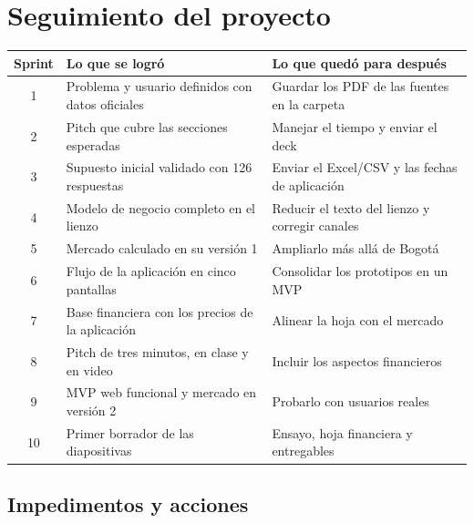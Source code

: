 \documentclass[11pt,a4paper]{article}
\begin{document}
\section{Seguimiento del proyecto}

\begin{tabularx}{\textwidth}{c X X}
  \toprule
  \textbf{Sprint} & \textbf{Lo que se logró} & \textbf{Lo que quedó para después} \\
  \midrule
  1 & Problema y usuario definidos con datos oficiales & Guardar los PDF de las fuentes en la carpeta \\
  2 & Pitch que cubre las secciones esperadas & Manejar el tiempo y enviar el deck \\
  3 & Supuesto inicial validado con 126 respuestas & Enviar el Excel/CSV y las fechas de aplicación \\
  4 & Modelo de negocio completo en el lienzo & Reducir el texto del lienzo y corregir canales \\
  5 & Mercado calculado en su versión 1 & Ampliarlo más allá de Bogotá \\
  6 & Flujo de la aplicación en cinco pantallas & Consolidar los prototipos en un MVP \\
  7 & Base financiera con los precios de la aplicación & Alinear la hoja con el mercado \\
  8 & Pitch de tres minutos, en clase y en video & Incluir los aspectos financieros \\
  9 & MVP web funcional y mercado en versión 2 & Probarlo con usuarios reales \\
  10 & Primer borrador de las diapositivas & Ensayo, hoja financiera y entregables \\
  \bottomrule
\end{tabularx}

\subsection{Impedimentos y acciones}
\end{document}
